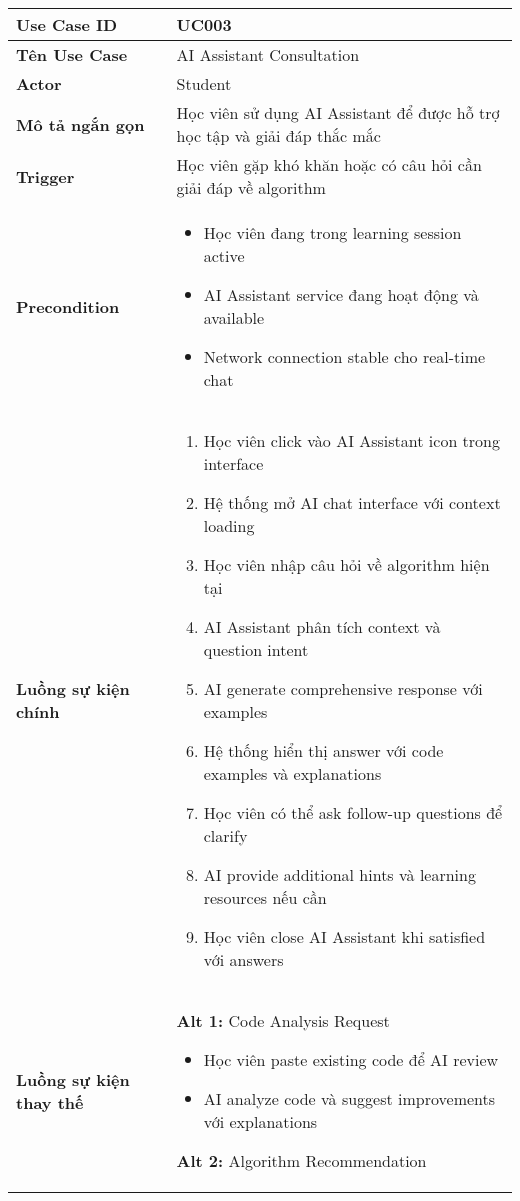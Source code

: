 \begin{longtable}{| p{3cm} | p{10cm} |}
\hline
\textbf{Use Case ID} & UC003 \\ \hline
\textbf{Tên Use Case} & AI Assistant Consultation \\ \hline
\textbf{Actor} & Student \\ \hline
\textbf{Mô tả ngắn gọn} & Học viên sử dụng AI Assistant để được hỗ trợ học tập và giải đáp thắc mắc \\ \hline
\textbf{Trigger} & Học viên gặp khó khăn hoặc có câu hỏi cần giải đáp về algorithm \\ \hline
\textbf{Precondition} & 
\begin{itemize}
    \item Học viên đang trong learning session active
    \item AI Assistant service đang hoạt động và available
    \item Network connection stable cho real-time chat
\end{itemize} \\ \hline
\textbf{Luồng sự kiện chính} & 
\begin{enumerate}
    \item Học viên click vào AI Assistant icon trong interface
    \item Hệ thống mở AI chat interface với context loading
    \item Học viên nhập câu hỏi về algorithm hiện tại
    \item AI Assistant phân tích context và question intent
    \item AI generate comprehensive response với examples
    \item Hệ thống hiển thị answer với code examples và explanations
    \item Học viên có thể ask follow-up questions để clarify
    \item AI provide additional hints và learning resources nếu cần
    \item Học viên close AI Assistant khi satisfied với answers
\end{enumerate} \\ \hline
\textbf{Luồng sự kiện thay thế} & 
\textbf{Alt 1:} Code Analysis Request
\begin{itemize}
    \item Học viên paste existing code để AI review
    \item AI analyze code và suggest improvements với explanations
\end{itemize}
\textbf{Alt 2:} Algorithm Recommendation

\end{longtable}
